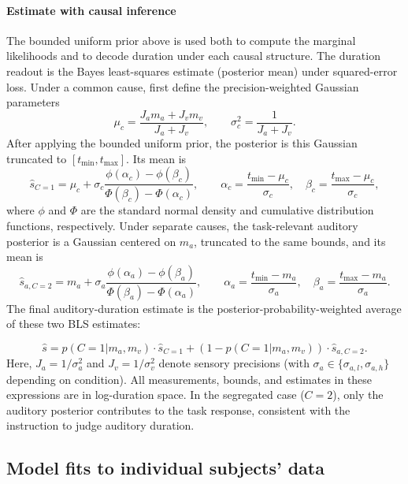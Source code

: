 \documentclass{biorxiv}
\begin{document}
\paragraph{Estimate with causal inference}
The bounded uniform prior above is used both to compute the marginal likelihoods and to decode duration under each causal structure. The duration readout is the Bayes least-squares estimate (posterior mean) under squared-error loss. Under a common cause, first define the precision-weighted Gaussian parameters
\begin{equation}
\mu_c = \frac{J_a m_a + J_v m_v}{J_a + J_v},
\qquad
\sigma_c^2 = \frac{1}{J_a + J_v}.
\end{equation}
After applying the bounded uniform prior, the posterior is this Gaussian truncated to $[t_{\min},t_{\max}]$. Its mean is
\begin{equation}
\hat{s}_{C=1}
= \mu_c + \sigma_c
\frac{\phi(\alpha_c)-\phi(\beta_c)}
{\Phi(\beta_c)-\Phi(\alpha_c)},
\qquad
\alpha_c=\frac{t_{\min}-\mu_c}{\sigma_c},
\quad
\beta_c=\frac{t_{\max}-\mu_c}{\sigma_c},
\end{equation}
where $\phi$ and $\Phi$ are the standard normal density and cumulative distribution functions, respectively. Under separate causes, the task-relevant auditory posterior is a Gaussian centered on $m_a$, truncated to the same bounds, and its mean is
\begin{equation}
\hat{s}_{a,C=2}
= m_a + \sigma_a
\frac{\phi(\alpha_a)-\phi(\beta_a)}
{\Phi(\beta_a)-\Phi(\alpha_a)},
\qquad
\alpha_a=\frac{t_{\min}-m_a}{\sigma_a},
\quad
\beta_a=\frac{t_{\max}-m_a}{\sigma_a}.
\end{equation}
The final auditory-duration estimate is the posterior-probability-weighted average of these two BLS estimates:

\begin{equation}
\hat{s} = p(C=1 | m_a, m_v) \cdot \hat{s}_{C=1}
+ (1 - p(C=1 | m_a, m_v)) \cdot \hat{s}_{a,C=2}.
\end{equation}
Here, $J_a = 1/\sigma_a^2$ and $J_v = 1/\sigma_v^2$ denote sensory precisions (with $\sigma_a \in \{\sigma_{a,l}, \sigma_{a,h}\}$ depending on condition). All measurements, bounds, and estimates in these expressions are in log-duration space. In the segregated case ($C=2$), only the auditory posterior contributes to the task response, consistent with the instruction to judge auditory duration.


\subsection{Model fits to individual subjects' data}
\end{document}
